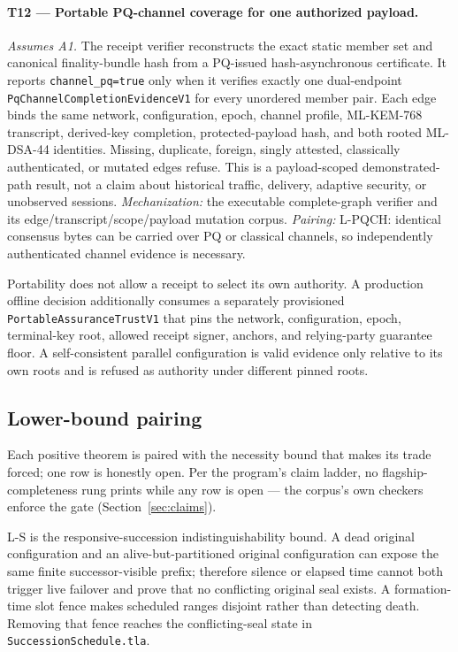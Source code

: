 \documentclass[11pt]{article}
\newcommand{\code}[1]{\texttt{#1}}
\begin{document}
\paragraph{T12 --- Portable PQ-channel coverage for one authorized payload.}
\textit{Assumes A1.} The receipt verifier reconstructs the exact static member
set and canonical finality-bundle hash from a PQ-issued hash-asynchronous
certificate. It reports \code{channel\_pq=true} only when it verifies exactly
one dual-endpoint \code{PqChannelCompletionEvidenceV1} for every unordered
member pair. Each edge binds the same network, configuration, epoch, channel
profile, ML-KEM-768 transcript, derived-key completion, protected-payload hash,
and both rooted ML-DSA-44 identities. Missing, duplicate, foreign, singly
attested, classically authenticated, or mutated edges refuse. This is a
payload-scoped demonstrated-path result, not a claim about historical traffic,
delivery, adaptive security, or unobserved sessions. \textit{Mechanization:}
the executable complete-graph verifier and its edge/transcript/scope/payload
mutation corpus. \textit{Pairing:} L-PQCH: identical consensus bytes can be
carried over PQ or classical channels, so independently authenticated channel
evidence is necessary.

Portability does not allow a receipt to select its own authority. A production
offline decision additionally consumes a separately provisioned
\code{PortableAssuranceTrustV1} that pins the network, configuration, epoch,
terminal-key root, allowed receipt signer, anchors, and relying-party guarantee
floor. A self-consistent parallel configuration is valid evidence only
relative to its own roots and is refused as authority under different pinned
roots.

\subsection{Lower-bound pairing}
\label{sec:pairing-table}

Each positive theorem is paired with the necessity bound that makes its
trade forced; one row is honestly open. Per the program's claim
ladder, no flagship-completeness rung prints while any row is open --- the
corpus's own checkers enforce the gate (Section~\ref{sec:claims}).

L-S is the responsive-succession indistinguishability bound. A dead original
configuration and an alive-but-partitioned original configuration can expose
the same finite successor-visible prefix; therefore silence or elapsed time
cannot both trigger live failover and prove that no conflicting original seal
exists. A formation-time slot fence makes scheduled ranges disjoint rather
than detecting death. Removing that fence reaches the conflicting-seal state
in \code{SuccessionSchedule.tla}.
\end{document}
